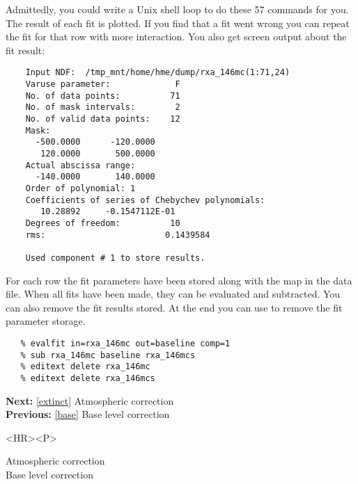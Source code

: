    Admittedly, you could write a Unix shell loop to do these 57 commands for
   you. The result of each fit is plotted. If you find that a fit went wrong
   you can repeat the fit for that row with more interaction. You also get
   screen output about the fit result:

\begin{verbatim}
    Input NDF:  /tmp_mnt/home/hme/dump/rxa_146mc(1:71,24)
    Varuse parameter:             F
    No. of data points:          71
    No. of mask intervals:        2
    No. of valid data points:    12
    Mask:
      -500.0000      -120.0000
       120.0000       500.0000
    Actual abscissa range:
      -140.0000       140.0000
    Order of polynomial: 1
    Coefficients of series of Chebychev polynomials:
       10.28892     -0.1547112E-01
    Degrees of freedom:          10
    rms:                        0.1439584

    Used component # 1 to store results.
\end{verbatim}

\begin{latexonly}
\begin{center}
\leavevmode\epsfysize=80mm
\end{center}
\end{latexonly}

   For each row the fit parameters have been stored along with the map
   in the data file. When all fits have been made, they can be evaluated
   and subtracted. You can also remove the fit results stored. At the
   end you can use
{\tt {}}
   to remove the fit parameter storage.

\begin{verbatim}
   % evalfit in=rxa_146mc out=baseline comp=1
   % sub rxa_146mc baseline rxa_146mcs
   % editext delete rxa_146mc
   % editext delete rxa_146mcs
\end{verbatim}

\begin{latexonly}
{\bf Next:} \ref{extinct} Atmospheric correction\\
{\bf Previous:} \ref{base} Base level correction\\
\end{latexonly}

\begin{htmlonly}
\begin{rawhtml} <HR><P> \end{rawhtml}
{\bf {}} Atmospheric correction\\
{\bf {}} Base level correction\\
{\bf {}}\\
{\bf {}}\\
\end{htmlonly}


